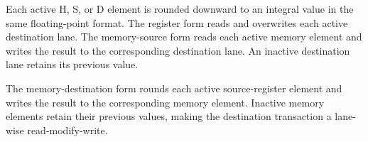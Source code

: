 Each active H, S, or D element is rounded downward to an integral value in the
same floating-point format. The register form reads and overwrites each active
destination lane. The memory-source form reads each active memory element and
writes the result to the corresponding destination lane. An inactive
destination lane retains its previous value.

The memory-destination form rounds each active source-register element and
writes the result to the corresponding memory element. Inactive memory elements
retain their previous values, making the destination transaction a lane-wise
read-modify-write.
